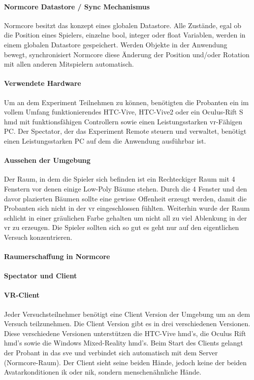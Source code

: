 \documentclass[a4paper,11pt]{article}%
\renewcommand{\\}{\vspace*{0.5\baselineskip} \newline}
\begin{document}
\paragraph{Normcore Datastore / Sync Mechanismus}
Normcore besitzt das konzept eines globalen Datastore.  Alle Zustände, egal ob die Position eines Spielers, einzelne bool, integer oder float Variablen, werden in einem globalen Datastore gespeichert. Werden Objekte in der Anwendung bewegt, synchronisiert Normcore diese Änderung der Position und/oder Rotation mit allen anderen Mitspielern automatisch.

\paragraph{Verwendete Hardware}
Um an dem Experiment Teilnehmen zu können, benötigten die Probanten ein im vollem Umfang funktionierendes HTC-Vive, HTC-Vive2 oder ein Oculus-Rift S \ac{hmd} mit funktionsfähigen Controllern sowie einen Leistungsstarken \ac{vr}-Fähigen PC. Der Spectator, der das Experiment Remote steuern und verwaltet, benötigt einen Leistungsstarken PC auf dem die Anwendung ausführbar ist.

\paragraph{Aussehen der Umgebung}
Der Raum, in dem die Spieler sich befinden ist ein Rechteckiger Raum mit 4 Fenstern vor denen einige Low-Poly Bäume stehen. Durch die 4 Fenster und den davor plazierten Bäumen sollte eine gewisse Offenheit erzeugt werden, damit die Probanten sich nicht in der \ac{vr} eingeschlossen fühlten. Weiterhin wurde der Raum schlicht in einer gräulichen Farbe gehalten um  nicht all zu viel Ablenkung in der \ac{vr} zu erzeugen. Die Spieler sollten sich so gut es geht nur auf den eigentlichen Versuch konzentrieren. 

\paragraph{Raumerschaffung in Normcore}

\paragraph{Spectator und Client}

\paragraph{VR-Client}
Jeder Versuchsteilnehmer benötigt eine Client Version der Umgebung um an dem Versuch teilzunehmen. Die Client Version gibt es in drei verschiedenen Versionen. Diese verschiedene Versionen unterstützen die HTC-Vive \ac{hmd}'s, die Oculus Rift \ac{hmd}'s sowie die Windows Mixed-Reality \ac{hmd}'s. Beim Start des Clients gelangt der Probant in das \ac{sve} und verbindet sich automatisch mit dem Server (Normcore-Raum).
Der Client sieht seine beiden Hände, jedoch keine der beiden Avatarkonditionen \ac{ik} oder \ac{nik}, sondern menschenähnliche Hände.
\end{document}
